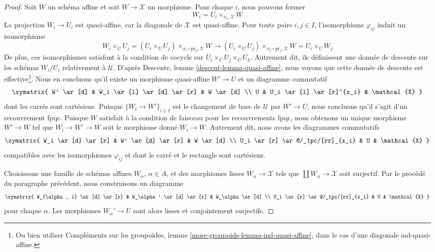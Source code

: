 \begin{proof}
\medskip\noindent
Soit $W$ un schéma affine et soit $W \to \mathcal{X}$
un morphisme. Pour chaque $i$, nous pouvons former
$$
W_i = U_i \times_{x_i, \mathcal{X}} W
$$
La projection $W_i \to U_i$ est quasi-affine, car la
diagonale de $\mathcal{X}$ est quasi-affine. Pour toute paire
$i, j \in I$, l'isomorphisme $\varphi_{ij}$ induit
un isomorphisme
$$
W_i \times_U U_j =
(U_i \times_U U_j) \times_{x_i \circ \text{pr}_0, \mathcal{X}} W
\to
(U_i \times_U U_j) \times_{x_j \circ \text{pr}_1, \mathcal{X}} W =
U_i \times_U W_j
$$
De plus, ces isomorphismes satisfont à la condition de cocycle sur
$U_i \times_U U_j \times_U U_k$. Autrement dit, ils
définissent une donnée de descente sur les schémas $W_i/U_i$ relativement à $\mathcal{U}$.
D'après Descente, lemme \ref{descent-lemma-quasi-affine},
nous voyons que cette donnée de descente est effective\footnote{Ou bien utiliser
Compléments sur les groupoïdes, lemme \ref{more-groupoids-lemma-ind-quasi-affine},
dans le cas d'une diagonale ind-quasi-affine.}.
Nous en concluons qu'il existe un morphisme quasi-affine
$W' \to U$ et un diagramme commutatif
$$
\xymatrix{
W' \ar[d] &
W_i \ar[l] \ar[d] \ar[r] &
W \ar[d] \\
U &
U_i \ar[l] \ar[r]^{x_i} &
\mathcal{X}
}
$$
dont les carrés sont cartésiens. Puisque $\{W_i \to W'\}_{i \in I}$
est le changement de base de $\mathcal{U}$ par $W' \to U$, nous concluons
qu'il s'agit d'un recouvrement fpqc. Puisque $W$ satisfait à la condition de faisceau
pour les recouvrements fpqc, nous obtenons un unique morphisme
$W' \to W$ tel que $W_i \to W' \to W$ soit le morphisme donné
$W_i \to W$. Autrement dit, nous avons les diagrammes commutatifs
$$
\xymatrix{
W_i \ar[d] \ar[r] &
W' \ar[d] \ar[r] &
W \ar[d] \\
U_i \ar[r] \ar@/_1pc/[rr]_{x_i} &
U &
\mathcal{X}
}
$$
compatibles avec les isomorphismes $\varphi_{ij}$ et dont le
carré et le rectangle sont cartésiens.

\medskip\noindent
Choisissons une famille de schémas affines $W_\alpha$, $\alpha \in A$,
et des morphismes lisses $W_\alpha \to \mathcal{X}$ tels que
$\coprod W_\alpha \to \mathcal{X}$ soit surjectif.
Par le procédé du paragraphe précédent, nous construisons
un diagramme
$$
\xymatrix{
W_{\alpha, i} \ar[d] \ar[r] &
W_\alpha' \ar[d] \ar[r] &
W_\alpha \ar[d] \\
U_i \ar[r] \ar@/_1pc/[rr]_{x_i} &
U &
\mathcal{X}
}
$$
pour chaque $\alpha$. Les morphismes $W_\alpha' \to U$ sont alors
lisses et conjointement surjectifs.


\end{proof}
